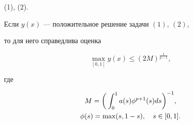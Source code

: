 (1), (2).





\begin{thm}


Если $ y(x)$ --- положительное решение задачи $(1)$, $(2)$,


то для него справедлива оценка


\begin{equation}


\max\limits_{[0,1]} y(x)\leq (2M)^{\frac{1}{p-1}},


\end{equation}


где


\begin{gather}


M=\bigg(\int_0^1a(s)\phi^{p+1}


(s)ds\bigg)^{-1},\\


%


\phi(s)=\max(s,1-s),\quad s\in{[0,1]}. \notag


\end{gather}


\end{thm}





